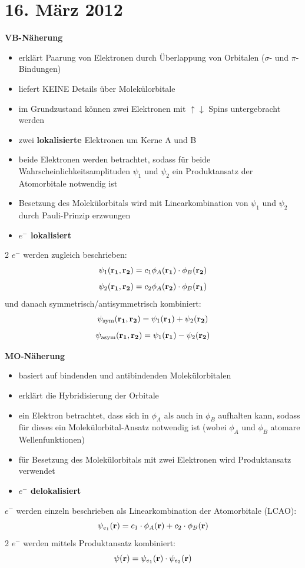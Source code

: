 \section{16. März 2012}

\label{q:41}

\textbf{VB-Näherung}
\begin{itemize}  
    \item erklärt Paarung von Elektronen durch Überlappung von Orbitalen ($\sigma$- und $\pi$-Bindungen)
    \item liefert KEINE Details über Molekülorbitale
    \item im Grundzustand können zwei Elektronen mit $\uparrow \downarrow$ Spins untergebracht werden
    \item zwei \textbf{lokalisierte} Elektronen um Kerne A und B
    \item beide Elektronen werden betrachtet, sodass für beide Wahrscheinlichkeitsamplituden $\psi_1$ und $\psi_2$ ein Produktansatz der Atomorbitale notwendig ist
    \item Besetzung des Molekülorbitals wird mit Linearkombination von $\psi_1$ und $\psi_2$ durch Pauli-Prinzip erzwungen
    \item \textbf{$e^-$ lokalisiert}
\end{itemize}
2 $e^-$ werden zugleich beschrieben:
\[\psi_1(\vb{r_1},\vb{r_2}) = c_1 \phi_A(\vb{r_1}) \cdot \phi_B(\vb{r_2})\]
\[\psi_2(\vb{r_1},\vb{r_2}) = c_2 \phi_A(\vb{r_2}) \cdot \phi_B(\vb{r_1})\]
und danach symmetrisch/antisymmetrisch kombiniert: 
\[\psi_{\text{sym}} (\vb{r_1},\vb{r_2}) = \psi_1(\vb{r_1}) + \psi_2(\vb{r_2})\]
\[\psi_{\text{asym}}(\vb{r_1},\vb{r_2}) = \psi_1(\vb{r_1}) - \psi_2(\vb{r_2})\]

\noindent
\textbf{MO-Näherung}
\begin{itemize}
    \item basiert auf bindenden und antibindenden Molekülorbitalen
    \item erklärt die Hybridisierung der Orbitale
    \item ein Elektron betrachtet, dass sich in $\phi_A$ als auch in $\phi_B$ aufhalten kann, sodass für dieses ein Molekülorbital-Ansatz notwendig ist (wobei $\phi_A$ und $\phi_B$ atomare Wellenfunktionen)
    \item für Besetzung des Molekülorbitals mit zwei Elektronen wird Produktansatz verwendet
    \item \textbf{$e^-$ delokalisiert}
\end{itemize}
$e^-$ werden einzeln beschrieben als Linearkombination der Atomorbitale (LCAO):
\[\psi_{e_1}(\vb{r}) = c_1 \cdot \phi_A(\vb{r}) +c_2 \cdot \phi_B(\vb{r})\]
2 $e^-$ werden mittels Produktansatz kombiniert:
\[\psi(\vb{r}) = \psi_{e_1}(\vb{r}) \cdot \psi_{e_2}(\vb{r}) \]

